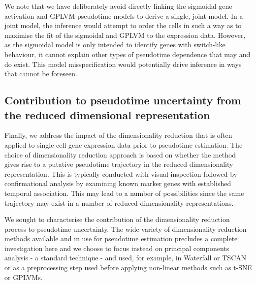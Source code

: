We note that we have deliberately avoid directly linking the sigmoidal gene activation and GPLVM pseudotime models to derive a single, joint model. In a joint model, the inference would attempt to order the cells in such a way as to maximise the fit of the sigmoidal and GPLVM to the expression data. However, as the sigmoidal model is only intended to identify genes with switch-like behaviour, it cannot explain other types of pseudotime dependence that may and do exist. This model misspecification would potentially drive inference in ways that cannot be foreseen.

\subsection{Contribution to pseudotime uncertainty from the reduced dimensional representation}

Finally, we address the impact of the dimensionality reduction that is often applied to single cell gene expression data prior to pseudotime estimation. The choice of dimensionality reduction approach is based on whether the method gives rise to a putative pseudotime trajectory in the reduced dimensionality representation. This is typically conducted with visual inspection followed by confirmational analysis by examining known marker genes with established temporal association. This may lead to a number of possibilities since the same trajectory may exist in a number of reduced dimensionality representations.

We sought to characterise the contribution of the dimensionality reduction process to pseudotime uncertainty. The wide variety of dimensionality reduction methods available and in use for pseudotime estimation precludes a complete investigation here and we choose to focus instead on principal components analysis - a standard technique - and used, for example, in Waterfall \cite{Shin2015} or TSCAN \cite{Ji2016-gx} or as a preprocessing step used before applying non-linear methods such as t-SNE or GPLVMs.

